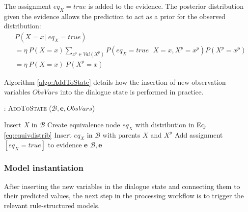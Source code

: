 The assignment $\mathit{eq}_{X} \!=\! true$ is added to the evidence. The posterior distribution given the evidence allows the prediction to act as a prior for the observed distribution:
\begin{align}
&P(X = x \, | \, \mathit{eq}_{X}\!=\!true) \nonumber \\
&=  \eta \ P(X\!=\!x)  \sum_{x^p \in \mathit{Val}(X^p)} P(\mathit{eq}_{X}\!=\!true\, |\, X\!=\!x, X^p \!=\!x^p ) P(X^p\!=\!x^p)  \nonumber\\
&= \eta \ P(X\!=\!x) \ P(X^p\!=\!x)  \nonumber 
\end{align}


Algorithm \ref{algo:AddToState} details how the insertion of new observation variables $\mathit{ObsVars}$ into the dialogue state is performed in practice. 

\begin{algorithm}[ht]
\caption{: \textsc{AddToState} ($\mathcal{B}, \mathbf{e}, \mathit{ObsVars}$)}
\begin{algorithmic}[1] \vspace{1mm}
\STATE Insert $X$ in $\mathcal{B}$ 
\ENDIF
{}
\STATE Create equivalence node $\mathit{eq}_{X}$ with distribution in Eq. \eqref{eq:equivdistrib}
\STATE Insert $\mathit{eq}_{X}$ in $\mathcal{B}$ with parents $\mathit{X}$ and $\mathit{X}^p$
\STATE Add assignment $[\mathit{eq}_{X}\!=\!true]$ to evidence $\mathbf{e}$
\ENDIF
\ENDFOR
\RETURN $\mathcal{B}, \mathbf{e}$
\end{algorithmic}
\label{algo:AddToState}
\end{algorithm}



\subsubsection*{Model instantiation}

After inserting the new variables in the dialogue state and connecting them to their predicted values, the next step in the processing workflow is to trigger the relevant rule-structured models. 

